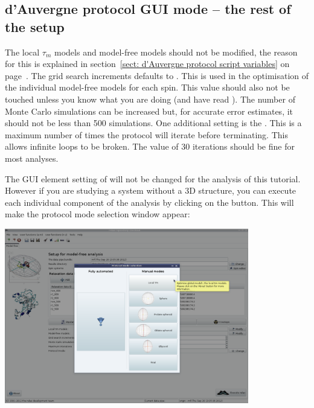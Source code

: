 \begin{htmlonly}
\begin{htmlonly}
\subsection{d'Auvergne protocol GUI mode -- the rest of the setup}

The local $\tau_m$ models and model-free models should not be modified, the reason for this is explained in section~\ref{sect: d'Auvergne protocol script variables} on page~\pageref{sect: d'Auvergne protocol script variables}.  The grid search increments defaults to .  This is used in the optimisation of the individual model-free models for each spin.  This value should also not be touched unless you know what you are doing (and have read \citet{dAuvergneGooley08a}).  The number of Monte Carlo simulations can be increased but, for accurate error estimates, it should not be less than 500 simulations.  One additional setting is the .  This is a maximum number of times the protocol will iterate before terminating.  This allows infinite loops to be broken.  The value of 30 iterations should be fine for most analyses.

The  GUI element setting of  will not be changed for the analysis of this tutorial.  However if you are studying a system without a 3D structure, you can execute each individual component of the analysis by clicking on the  button.  This will make the protocol mode selection window appear:

\begin{minipage}[h]{\linewidth}
\centerline{\includegraphics[width=0.8\textwidth, bb=14 14 1415 1019]{graphics/screenshots/mf_analysis/protocol_mode}}
\end{minipage}


\end{htmlonly}
\end{htmlonly}
